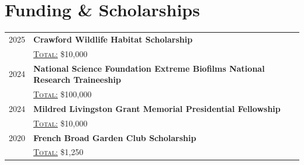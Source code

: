 \section{Funding \& Scholarships}

\setlength{\arrayrulewidth}{.01pt}
\setlength{\tabcolsep}{8pt}
\setlength{\LTpre}{0pt}

\begin{longtable}{r|p{15.6cm}}

    \small{2025} & \textbf{Crawford Wildlife Habitat Scholarship}\\
    & \textsc{\underline{Total:}} \$10,000
    \\
    
    \small{2024} & \textbf{National Science Foundation Extreme Biofilms National Research Traineeship}\\
    & \textsc{\underline{Total:}} \$100,000
    \\

   \small{2024} & \textbf{Mildred Livingston Grant Memorial Presidential Fellowship}\\
    & \textsc{\underline{Total:}} \$10,000
    \\

    \small{2020} & \textbf{French Broad Garden Club Scholarship} \\
    & \textsc{\underline{Total:}} \$1,250
    \\
    

\end{longtable}
